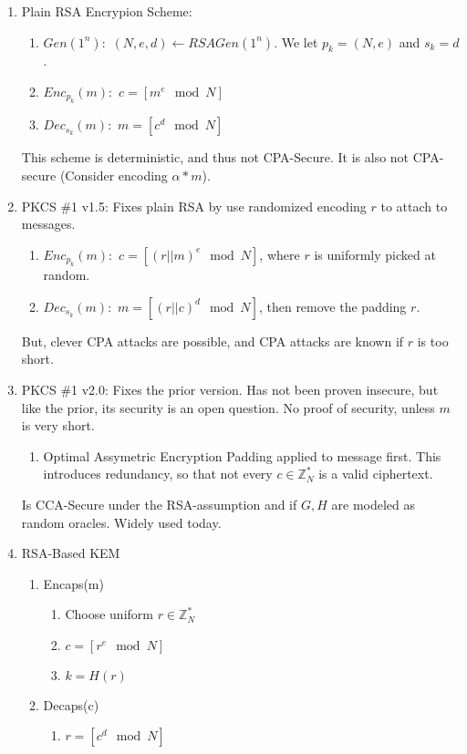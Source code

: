 \documentclass[12pt,letterpaper]{article}
\begin{document}
\begin{enumerate}
   		\item Plain RSA Encrypion Scheme:
   		\begin{enumerate}
   			\item $Gen(1^n):$ $(N,e,d)\leftarrow RSAGen(1^n)$. We let $p_k=(N,e)$ and $s_k=d$.
   			\item $Enc_{p_k}(m):$ $c=[m^e\mod N]$ 
   			\item $Dec_{s_k}(m):$ $m=[c^d\mod N]$
   		\end{enumerate}
   		This scheme is deterministic, and thus not CPA-Secure. It is also not CPA-secure (Consider encoding $\alpha*m$).
   		\item PKCS \#1 v1.5: Fixes plain RSA by use randomized encoding $r$ to attach to messages.
   		\begin{enumerate}
   			\item $Enc_{p_k}(m):$ $c=[(r||m)^e\mod N]$, where $r$ is uniformly picked at random. 
   			\item $Dec_{s_k}(m):$ $m=[(r||c)^d\mod N]$, then remove the padding $r$.
   		\end{enumerate}
   		But, clever CPA attacks are possible, and CPA attacks are known if $r$ is too short.\newpage
   		\item PKCS \#1 v2.0: Fixes the prior version. Has not been proven insecure, but like the prior, its security is an open question. No proof of security, unless $m$ is very short.
   		\begin{enumerate}
   			\item Optimal Assymetric Encryption Padding applied to message first. This introduces redundancy, so that not every $c\in\mathbb{Z}_N^*$ is a valid ciphertext.
   		\end{enumerate}
   		Is CCA-Secure under the RSA-assumption and if $G,H$ are modeled as random oracles. Widely used today.
   		\item RSA-Based KEM
   		\begin{enumerate}
   			\item Encaps(m)
   				\begin{enumerate}
 					\item Choose uniform $r\in\mathbb{Z}_N^*$
   					\item $c=[r^e\mod N]$
   					\item $k=H(r)$
   				\end{enumerate}
   			\item Decaps(c)
   				\begin{enumerate}
   					\item $r=[c^d\mod N]$

\end{enumerate}
\end{enumerate}
\end{enumerate}
\end{document}
